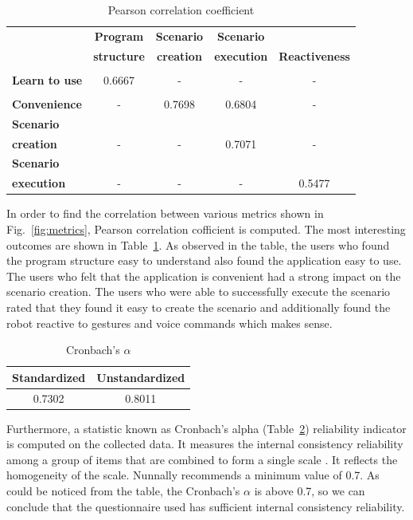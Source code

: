 \begin{table}[h]
\caption{Pearson correlation coefficient}
\label{table:correlation}
\begin{center}
\begin{tabular}{|l|c|c|c|c|}
\hline
  {} & \textbf{Program}& \textbf{Scenario}& \textbf{Scenario}& \textbf{}\\
    {} & \textbf{structure}& \textbf{creation}& \textbf{execution}& \textbf{Reactiveness}\\
\hline
{} & {} & {} & {} & {}\\
\textbf{Learn to use} & {0.6667} & {-} & {-} & {-}\\
\hline
{} & {} & {} & {} & {}\\
\textbf{Convenience} & {-} & {0.7698} & {0.6804} & {-}\\
\hline
\textbf{Scenario}  & {} & {} & {} & {}\\
\textbf{creation}  & {-} & {-} & {0.7071} & {-}\\
\hline
\textbf{Scenario} & {} & {} & {} & {}\\
\textbf{execution} & {-} & {-} & {-} & {0.5477}\\
\hline
\end{tabular}
\end{center}
\end{table}
In order to find the correlation between various metrics shown in Fig.~\ref{fig:metrics}, Pearson correlation cofficient is computed. The most interesting outcomes are shown in Table~\ref{table:correlation}. As observed in the table, the users who found the program structure easy to understand also found the application easy to use. The users who felt that the application is convenient had a strong impact on the scenario creation. The users who were able to successfully execute the scenario rated that they found it easy to create the scenario and additionally found the robot reactive to gestures and voice commands which makes sense. 

\begin{table}
\centering
\small
\caption{Cronbach's $\alpha$}
\label{table:cronbach}
\begin{tabular}{|c|c|}
    \hline                             
    \textbf{Standardized} & \textbf{Unstandardized}\\
    \hline
     0.7302 & 0.8011 \\
    \hline
\end{tabular}
\end{table}

Furthermore, a statistic known as Cronbach's alpha (Table~\ref{table:cronbach}) reliability indicator is computed on the collected data. It measures the internal consistency reliability among a group of items that are combined to form a single scale \cite{bartneck2009measurement}. It reflects the homogeneity of the scale. Nunnally \cite{nunnally1978psychometry} recommends a minimum value of 0.7. As could be noticed from the table, the Cronbach's $\alpha$ is above 0.7, so we can conclude that the questionnaire used has sufficient internal consistency reliability.
 
